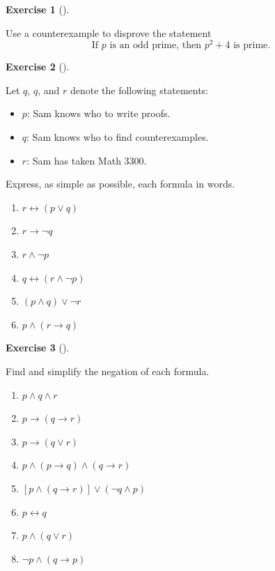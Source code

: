 \documentclass[
  letterpaper,
  10pt,
  reqno,
  twopage,
  openany]{book}
\providecommand{\tightlist}{%
  \setlength{\itemsep}{0pt}\setlength{\parskip}{0pt}}\usepackage{longtable,booktabs,array}
\theoremstyle{plain}
\theoremstyle{definition}
\newtheorem{exercise}{Exercise}[chapter]
\theoremstyle{definition}
\theoremstyle{definition}
\theoremstyle{plain}
\theoremstyle{plain}
\theoremstyle{remark}
\begin{document}
\leavevmode{}%
\begin{exercise}[]\label{exr-counterexample-to-disprove}

Use a counterexample to disprove the statement \[
\text{If $p$ is an odd prime, then $p^2+4$ is prime.}
\]

\end{exercise}

\leavevmode{}%
\begin{exercise}[]\label{exr-simple-as-possible}

Let \(q\), \(q\), and \(r\) denote the following statements:

\begin{itemize}
\tightlist
\item
  \(p\): Sam knows who to write proofs.
\item
  \(q\): Sam knows who to find counterexamples.
\item
  \(r\): Sam has taken Math 3300.
\end{itemize}

Express, as simple as possible, each formula in words.

\begin{enumerate}
\def\labelenumi{\arabic{enumi}.}
\tightlist
\item
  \(r\leftrightarrow (p\lor q)\)
\item
  \(r\rightarrow \neg q\)
\item
  \(r\land \neg p\)
\item
  \(q\leftrightarrow (r\land \neg p)\)
\item
  \((p\land q)\lor \neg r\)
\item
  \(p\land (r\rightarrow q)\)
\end{enumerate}

\end{exercise}

\leavevmode{}%
\begin{exercise}[]\label{exr-simplify-the-negation}

Find and simplify the negation of each formula.

\begin{enumerate}
\def\labelenumi{\arabic{enumi}.}
\tightlist
\item
  \(p\land q \land r\)
\item
  \(p\rightarrow (q\rightarrow r)\)
\item
  \(p\rightarrow (q\lor r)\)
\item
  \(p\land (p\rightarrow q)\land (q\rightarrow r)\)
\item
  \([p\land (q\rightarrow r)]\lor (\neg q\land p)\)
\item
  \(p\leftrightarrow q\)
\item
  \(p\land (q\lor r)\)
\item
  \(\neg p \land (q\rightarrow p)\)
\end{enumerate}

\end{exercise}
\end{document}

